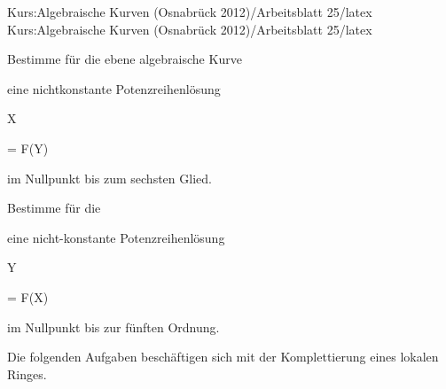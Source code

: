 Kurs:Algebraische Kurven (Osnabrück 2012)/Arbeitsblatt 25/latex
Kurs:Algebraische Kurven (Osnabrück 2012)/Arbeitsblatt 25/latex


\setcounter{section}{25}





{}

{


Bestimme für die ebene algebraische Kurve


 {  }


eine nichtkonstante Potenzreihenlösung


\mavergleichskette

{\vergleichskette

{ X
}

{ = }{ F(Y)
}

{  }{
}

{    }{
}

{   }{
}

}
{}{}{}
im Nullpunkt bis zum sechsten Glied.


}

{} {}



{}

{


Bestimme für die


 {  }


eine nicht-konstante Potenzreihenlösung


\mavergleichskette

{\vergleichskette

{ Y
}

{ = }{ F(X)
}

{  }{
}

{    }{
}

{   }{
}

}
{}{}{}
im Nullpunkt bis zur fünften Ordnung.


}

{} {}


Die folgenden Aufgaben beschäftigen sich mit der Komplettierung eines lokalen Ringes.



{}

